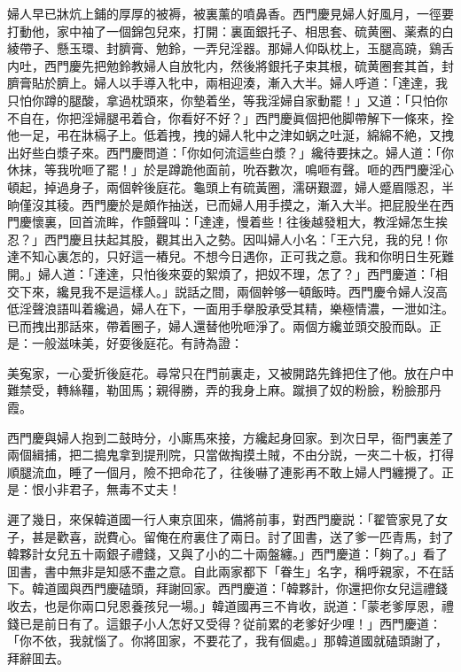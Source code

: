 婦人早已牀炕上鋪的厚厚的被褥，被裏薰的噴鼻香。西門慶見婦人好風月，一徑要打動他，家中袖了一個錦包兒來，打開：裏面銀托子、相思套、硫黄圈、薬煮的白綾帶子、懸玉環、封臍膏、勉鈴，一弄兒淫器。那婦人仰臥枕上，玉腿高蹺，鷄舌内吐，西門慶先把勉鈴教婦人自放牝内，然後將銀托子束其根，硫黄圈套其首，封臍膏貼於臍上。婦人以手導入牝中，兩相迎湊，漸入大半。婦人呼道：「達達，我只怕你蹲的腿酸，拿過枕頭來，你墊着坐，等我淫婦自家動罷！」又道：「只怕你不自在，你把淫婦腿弔着㒲，你看好不好？」西門慶眞個把他脚帶解下一條來，拴他一足，弔在牀槅子上。低着拽，拽的婦人牝中之津如蜗之吐涎，綿綿不絶，又拽出好些白漿子來。西門慶問道：「你如何流這些白漿？」纔待要抹之。婦人道：「你休抹，等我吮咂了罷！」於是蹲跪他面前，吮吞數次，鳴咂有聲。咂的西門慶淫心頓起，掉過身子，兩個幹後庭花。龜頭上有硫黃圈，濡硏艱澀，婦人蹙眉隱忍，半晌僅沒其稜。西門慶於是頗作抽送，已而婦人用手摸之，漸入大半。把屁股坐在西門慶懷裏，回首流眸，作顫聲叫：「達達，慢着些！往後越發粗大，教淫婦怎生挨忍？」西門慶且扶起其股，觀其出入之勢。因叫婦人小名：「王六兒，我的兒！你達不知心裏怎的，只好這一樁兒。不想今日遇你，正可我之意。我和你明日生死難開。」婦人道：「達達，只怕後來耍的絮煩了，把奴不理，怎了？」西門慶道：「相交下來，纔見我不是這樣人。」説話之間，兩個幹够一頓飯時。西門慶令婦人沒高低淫聲浪語叫着纔過，婦人在下，一面用手擧股承受其精，樂極情濃，一泄如注。已而拽出那話來，帶着圈子，婦人還替他吮咂淨了。兩個方纔並頭交股而臥。正是：一般滋味美，好耍後庭花。有詩為證：

\begin{myquote}
美寃家，一心愛折後庭花。尋常只在門前裏走，又被開路先鋒把住了他。放在户中難禁受，轉絲韁，勒囬馬；親得勝，弄的我身上麻。蹴損了奴的粉臉，粉臉那丹霞。
\end{myquote}

西門慶與婦人抱到二鼓時分，小廝馬來接，方纔起身回家。到次日早，衙門裏差了兩個緝捕，把二搗鬼拿到提刑院，只當做掏摸土賊，不由分説，一夾二十板，打得順腿流血，睡了一個月，險不把命花了，往後嚇了連影再不敢上婦人門纏攪了。正是：恨小非君子，無毒不丈夫！

遲了幾日，來保韓道國一行人東京囬來，備將前事，對西門慶説：「翟管家見了女子，甚是歡喜，説費心。留俺在府裏住了兩日。討了囬書，送了爹一匹青馬，封了韓夥計女兒五十兩銀子禮錢，又與了小的二十兩盤纏。」西門慶道：「夠了。」看了囬書，書中無非是知感不盡之意。自此兩家都下「眷生」名字，稱呼親家，不在話下。韓道國與西門慶磕頭，拜謝回家。西門慶道：「韓夥計，你還把你女兒這禮錢收去，也是你兩口兒恩養孩兒一場。」韓道國再三不肯收，説道：「蒙老爹厚恩，禮錢已是前日有了。這銀子小人怎好又受得？従前累的老爹好少哩！」西門慶道：「你不依，我就惱了。你將囬家，不要花了，我有個處。」那韓道國就磕頭謝了，拜辭囬去。

